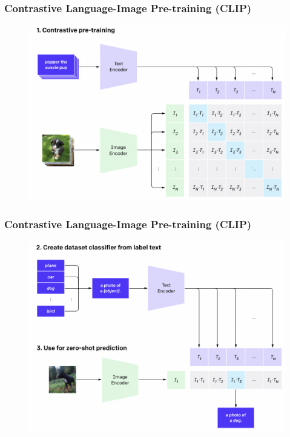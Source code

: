 \documentclass[
	11pt, compress%
]{beamer}
\begin{document}
\begin{frame}
	\frametitle{Contrastive Language-Image Pre-training (CLIP)}
	\begin{figure}
		\includegraphics[width=0.83\linewidth]{Images/CLIP1.png}
		\cite{CLIP}
	\end{figure}
\end{frame}

\begin{frame}
	\frametitle{Contrastive Language-Image Pre-training (CLIP)}
	\begin{figure}
		\includegraphics[width=0.83\linewidth]{Images/CLIP2.png}
		\cite{CLIP}
	\end{figure}
\end{frame}
\end{document}
